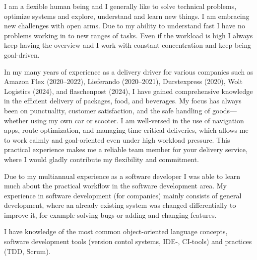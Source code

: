 \documentclass[fromphone,parskip=half]{scrlttr2}%
\newcommand\versionLanguageStart{}
\newcommand\versionLanguageEnd{}
\begin{document}
\begin{letter}
\versionLanguageStart%
		I am a flexible human being and I generally like to solve technical problems, optimize systems and explore, understand and learn new things.
		I am embracing new challenges with open arms.
		Due to my ability to understand fast I have no problems working in to new ranges of tasks.
		Even if the workload is high I always keep having the overview and I work with constant concentration and keep being goal-driven.
\versionLanguageEnd

\versionLanguageStart%
		In my many years of experience as a delivery driver for various companies such as Amazon Flex (2020–2022), Lieferando (2020–2021), Durstexpress (2020), Wolt Logistics (2024), and flaschenpost (2024), I have gained comprehensive knowledge in the efficient delivery of packages, food, and beverages.
		My focus has always been on punctuality, customer satisfaction, and the safe handling of goods—whether using my own car or scooter.
		I am well-versed in the use of navigation apps, route optimization, and managing time-critical deliveries, which allows me to work calmly and goal-oriented even under high workload pressure.
		This practical experience makes me a reliable team member for your delivery service, where I would gladly contribute my flexibility and commitment.
\versionLanguageEnd
		
\versionLanguageStart%
		Due to my multiannual experience as a software developer I was able to learn much about the practical workflow in the software development area.
		My experience in software development (for companies) mainly consists of general development, where an already existing system was changed differentially to improve it, for example solving bugs or adding and changing features.
\versionLanguageEnd

\versionLanguageStart%
		I have knowledge of the most common object-oriented language concepts, software development tools (version contol systems, IDE-, CI-tools) and practices (TDD, Scrum).
\versionLanguageEnd

%
%		
		

\end{letter}
\end{document}
